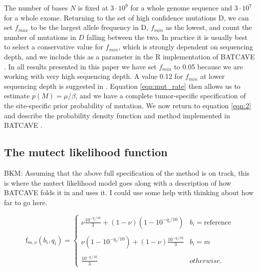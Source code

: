 \documentclass[a4,center,fleqn]{NAR}
\newcommand{\bkmcomment}[1]{{\color{blue}BKM: #1}}
\newcommand{\batcave}{BATCAVE }
\begin{document}
The number of bases $N$ is fixed at $3\cdot10^9$ for a whole genome sequence and $3\cdot10^7$ for a whole exome.
Returning to the set of high confidence mutations $\mathrm{D}$, we can set $f_{max}$ to be the largest allele frequency in $\mathrm{D}$, $f_{min}$ as the lowest, and count the number of mutations in $D$ falling between the two.
In practice it is usually best to select a conservative value for $f_{min}$, which is strongly dependent on sequencing depth, and we include this as a parameter in the R implementation of \batcave.
In all results presented in this paper we have set $f_{min}$ to 0.05 because we are working with very high sequencing depth.
A value 0.12 for $f_{min}$ at lower sequencing depth is suggested in \citet{Williams2016}. 
Equation \ref{eqn:mut_rate} then allows us to estimate $p(M) = \mu/\beta$, and we have a complete tumor-specific specification of the site-specific prior probability of mutation.
We now return to equation \ref{eqn:2} and describe the probability density function and method implemented in \batcave.

\subsection{The mutect likelihood function}
\bkmcomment{Assuming that the above full specification of the method is on track, this is where the mutect likelihood model goes along with a description of how \batcave folds it in and uses it.
I could use some help with thinking about how far to go here.}

$$
  \textrm{f}_{m,\nu}({b_i,q_i}) = \left\{
    \begin{array}{cr}
      \nu \frac{10^{-q_i/10}}{3} + (1-\nu)(1-10^{-q_i/10}) & b_i = \textrm{reference}\\ \\
      \nu(1-10^{-q_i/10}) + (1-\nu) \frac{10^{-q_i/10}}{3} & b_i = m\\ \\
      \frac{10^{-q_i/10}}{3} & otherwise.
    \end{array}
    \right.
$$

\end{document}
